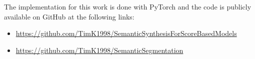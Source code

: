 \thispagestyle{plain}
The implementation for this work is done with PyTorch and the code is publicly available on GitHub at the following links: 
\begin{itemize}
    \item \url{https://github.com/TimK1998/SemanticSynthesisForScoreBasedModels}
    \item \url{https://github.com/TimK1998/SemanticSegmentation}
\end{itemize}
\thispagestyle{plain}